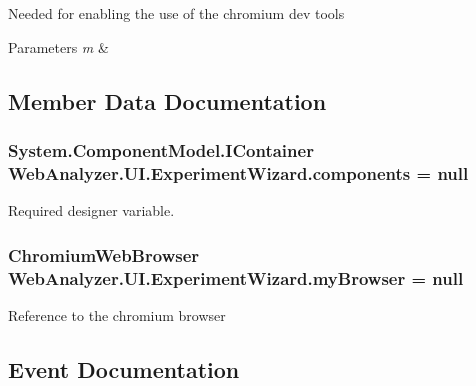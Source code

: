Needed for enabling the use of the chromium dev tools 


\begin{DoxyParams}{Parameters}
{\em m} & \\
\hline
\end{DoxyParams}


\subsection{Member Data Documentation}
\hypertarget{class_web_analyzer_1_1_u_i_1_1_experiment_wizard_abaa55aeb99b0ed9ef11725d650cec317}{}
\subsubsection[{components}]{\setlength{\rightskip}{0pt plus 5cm}System.\+Component\+Model.\+I\+Container Web\+Analyzer.\+U\+I.\+Experiment\+Wizard.\+components = null\hspace{0.3cm}{\ttfamily [private]}}\label{class_web_analyzer_1_1_u_i_1_1_experiment_wizard_abaa55aeb99b0ed9ef11725d650cec317}


Required designer variable. 

\hypertarget{class_web_analyzer_1_1_u_i_1_1_experiment_wizard_a47b2b792a5aba1e3594b5ce6dca7156c}{}
\subsubsection[{my\+Browser}]{\setlength{\rightskip}{0pt plus 5cm}Chromium\+Web\+Browser Web\+Analyzer.\+U\+I.\+Experiment\+Wizard.\+my\+Browser = null\hspace{0.3cm}{\ttfamily [private]}}\label{class_web_analyzer_1_1_u_i_1_1_experiment_wizard_a47b2b792a5aba1e3594b5ce6dca7156c}


Reference to the chromium browser 



\subsection{Event Documentation}
\hypertarget{class_web_analyzer_1_1_u_i_1_1_experiment_wizard_ac18185c9d12c074d2b82c2426e545461}{}
